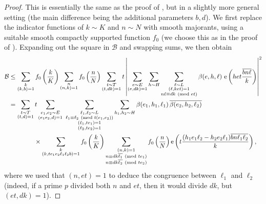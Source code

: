 \documentclass[reqno,11pt]{amsart}
\theoremstyle{definition}
\theoremstyle{remark}
\numberwithin{equation}{section}
\newcommand{\mB}{\mathcal{B}}
\newcommand{\e}{\textnormal{e}}
\renewcommand{\bar}{\overline}
\renewcommand{\pmod}[1]{\ (\textnormal{mod } #1)}
\begin{document}
\begin{proof}
This is essentially the same as the proof of \cite[Lemma 18.5]{maynard2020primes}, but in a slightly more general setting (the main difference being the additional parameters $b, d$). %
We first replace the indicator functions of $k \sim K$ and $n \sim N$ with smooth majorants, using a suitable smooth compactly supported function $f_0$ (we choose this as in the proof of \cite[Lemma 18.5]{maynard2020primes}). Expanding out the square in $\mB$ and swapping sums, we then obtain
\begin{equation} \label{eq:b-estimate}
\begin{aligned}
    \mB &\le 
    \sum_{\substack{k \\ (k, b) = 1}} f_0\left(\frac{k}{K}\right)
    \sum_{\substack{n \\ (n, k) = 1}} f_0\left(\frac{n}{N}\right) 
    \sum_{\substack{t \sim T \\ (t, dk) = 1}} t \left\vert
    \sum_{\substack{e \sim E \\ (e, dk) = 1}}
    \sum_{h \sim H} 
    \sum_{\substack{\ell \sim L \\ (\ell, ket) = 1 \\ n \ell \equiv d k \pmod{et}}} 
    \beta(e, h, \ell)\ \e\left(het \frac{\bar{b n \ell}}{k}\right)
    \right\vert^2
    \\
    &=
    \sum_{\substack{t \sim T \\ (t, d) = 1}} t 
    \sum_{\substack{e_1, e_2 \sim E \\ (e_1 e_2, d) = 1}}\ 
    \sum_{\substack{\ell_1, \ell_2 \sim L \\ \ell_1 \equiv \ell_2 \pmod{t(e_1, e_2)} \\ (\ell_1, te_1) = 1 \\ (\ell_2, te_2) = 1}}
    \sum_{h_1, h_2 \sim H} \beta(e_1, h_1, \ell_1) \, \bar{\beta(e_2, h_2, \ell_2)} 
    \\
    &\qquad\qquad \times 
    \sum_{\substack{k \\ (k, te_1e_2\ell_1\ell_2b) = 1}} 
    f_0\left(\frac{k}{K}\right)
    \sum_{\substack{(n, k) = 1 \\ n \equiv dk\bar{\ell_1} \pmod{te_1} \\ n \equiv dk\bar{\ell_2} \pmod{te_2}}}
    f_0\left(\frac{n}{N}\right)
    \e \left(t\frac{(h_1e_1\ell_2 - h_2e_2\ell_1)\bar{bn \ell_1 \ell_2}}{k} \right),
\end{aligned}
\end{equation}
where we used that $(n, et) = 1$ to deduce the congruence between $\ell_1$ and $\ell_2$ (indeed, if a prime $p$ divided both $n$ and $et$, then it would divide $dk$, but $(et, dk) = 1$).


\end{proof}
\end{document}
